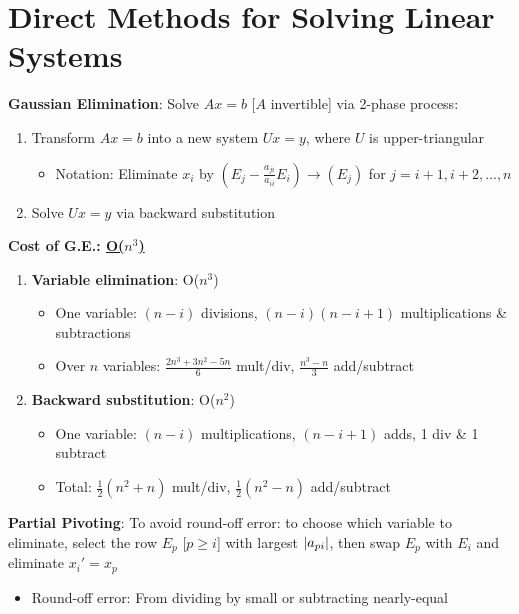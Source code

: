 \documentclass[12pt]{extarticle}
\begin{document}
\newpage
\section{Direct Methods for Solving Linear Systems}
\begin{whitebox}
    \textbf{Gaussian Elimination}: Solve $Ax=b$ [$A$ invertible] via 2-phase process: \begin{enumerate}
        \item Transform $Ax=b$ into a new system $Ux=y$, where $U$ is upper-triangular \begin{itemize}
            \item Notation: Eliminate $x_i$ by $(E_j-\frac{a_{ji}}{a_{ii}}E_i)\to(E_j)$ for $j=i+1,i+2,\hdots,n$
        \end{itemize}
        \item Solve $Ux=y$ via backward substitution
    \end{enumerate}
\end{whitebox}

\newp
\textbf{Cost of G.E.: \underline{O($n^3$)}} \begin{enumerate}
    \item \textbf{Variable elimination}: O($n^3$) \begin{itemize}
        \item One variable: $(n-i)$ divisions, $(n-i)(n-i+1)$ multiplications \& subtractions
        \item Over $n$ variables: $\frac{2n^3+3n^2-5n}{6}$ mult/div, $\frac{n^3-n}{3}$ add/subtract
    \end{itemize}
    \item \textbf{Backward substitution}: O($n^2$) \begin{itemize}
        \item One variable: $(n-i)$ multiplications, $(n-i+1)$ adds, 1 div \& 1 subtract
        \item Total: $\frac{1}{2}(n^2+n)$ mult/div, $\frac{1}{2}(n^2-n)$ add/subtract
    \end{itemize}
\end{enumerate}

\newp
\textbf{Partial Pivoting}: To avoid round-off error: to choose which variable to eliminate, select the row $E_p$ [$p\geq i$] with largest $\left|a_{pi}\right|$, then swap $E_p$ with $E_i$ and eliminate $x_i'=x_p$ \begin{itemize}
    \item Round-off error: From dividing by small or subtracting nearly-equal
\end{itemize}
\end{document}
